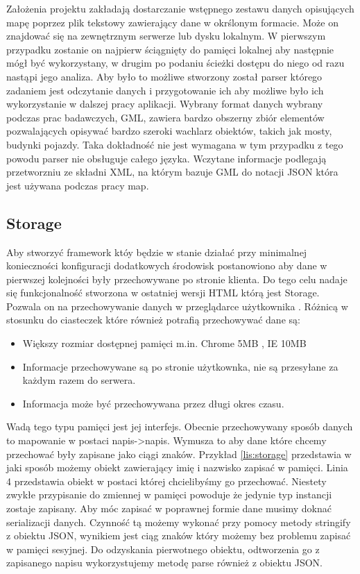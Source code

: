 Założenia projektu zakładają dostarczanie wstępnego zestawu danych opisujących mapę poprzez plik tekstowy zawierający dane w okrślonym formacie. Może on znajdować się na zewnętrznym serwerze lub dysku lokalnym. W pierwszym przypadku zostanie on najpierw ściągnięty do pamięci lokalnej aby następnie mógł być wykorzystany, w drugim po podaniu ścieżki dostępu do niego  od razu nastąpi jego analiza. Aby było to możliwe stworzony został parser którego zadaniem jest odczytanie danych i przygotowanie ich aby możliwe było ich wykorzystanie w dalszej pracy aplikacji.
Wybrany format danych wybrany podczas prac badawczych, GML, zawiera bardzo obszerny zbiór elementów pozwalających opisywać bardzo szeroki wachlarz obiektów, takich jak mosty, budynki pojazdy. Taka dokładność nie jest wymagana w tym przypadku z tego powodu parser nie obsługuje całego języka.
Wczytane informacje podlegają przetworzniu ze składni XML, na którym bazuje GML do notacji JSON która jest używana podczas pracy map.

\subsection{Storage}
\label{subsec:storage5}
Aby stworzyć framework któy będzie w stanie działać przy minimalnej konieczności konfiguracji dodatkowych środowisk postanowiono aby dane w pierwszej kolejności były przechowywane po stronie klienta. Do tego celu nadaje się funkcjonalność stworzona w ostatniej wersji HTML którą jest Storage. Pozwala on na przechowywanie danych w przeglądarce użytkownika \cite{html5dive}. Różnicą w stosunku do ciasteczek które również potrafią przechowywać dane są:
\begin{itemize}
\item
Większy rozmiar dostępnej pamięci m.in. Chrome 5MB \nocite{chrome5mb}, IE 10MB
\item
Informacje przechowywane są po stronie użytkownka, nie są przesyłane za każdym razem do serwera.
\item
Informacja może być przechowywana przez długi okres czasu.
\end{itemize}

Wadą tego typu pamięci jest jej interfejs. Obecnie przechowywany sposób danych to mapowanie w postaci napis->napis. Wymusza to aby dane które chcemy przechować były zapisane jako ciągi znaków. Przykład \ref{lis:storage} przedstawia w jaki sposób możemy obiekt zawierający imię i nazwisko zapisać w pamięci. Linia 4 przedstawia obiekt w postaci której chcielibyśmy go przechować. Niestety zwykłe przypisanie do zmiennej w pamięci powoduje że jedynie typ instancji zostaje zapisany. Aby móc zapisać w poprawnej formie dane musimy doknać serializacji danych. Czynność tą możemy wykonać przy pomocy metody stringify z obiektu JSON, wynikiem jest ciąg znaków który możemy bez problemu zapisać w pamięci sesyjnej. Do odzyskania pierwotnego obiektu, odtworzenia go z zapisanego napisu wykorzystujemy metodę parse również z obiektu JSON.

